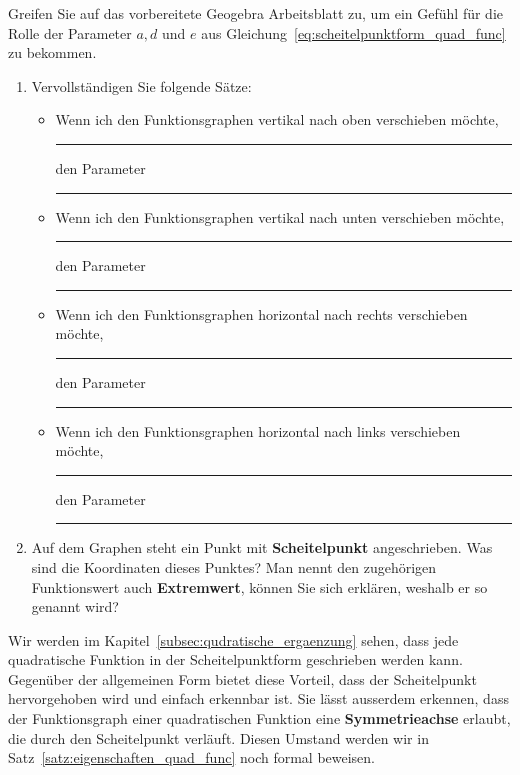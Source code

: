 \documentclass[12pt]{article}
\begin{document}
\begin{exercise}\label{ex:scheitelpunkt_lueckentext}
Greifen Sie auf das vorbereitete Geogebra Arbeitsblatt zu, um ein Gefühl für die Rolle der Parameter $a, d$ und $e$ aus Gleichung~\ref{eq:scheitelpunktform_quad_func} zu bekommen.
\begin{enumerate}
\item Vervollständigen Sie folgende Sätze:
\begin{itemize}
\item Wenn ich den Funktionsgraphen vertikal nach oben verschieben möchte, \rule{3cm}{0.5pt} den Parameter \rule{0.5cm}{0.5pt}
\item  Wenn ich den Funktionsgraphen vertikal nach unten verschieben möchte, \rule{3cm}{0.5pt} den Parameter \rule{0.5cm}{0.5pt}
\item  Wenn ich den Funktionsgraphen horizontal nach rechts verschieben möchte, \rule{3cm}{0.5pt} den Parameter \rule{0.5cm}{0.5pt}
\item  Wenn ich den Funktionsgraphen horizontal nach links verschieben möchte, \rule{3cm}{0.5pt} den Parameter \rule{0.5cm}{0.5pt}
\end{itemize}
\item Auf dem Graphen steht ein Punkt mit \textbf{Scheitelpunkt} angeschrieben. Was sind die Koordinaten dieses Punktes? Man nennt den zugehörigen Funktionswert auch \textbf{Extremwert}, können Sie sich erklären, weshalb er so genannt wird?
\end{enumerate}
\end{exercise}

Wir werden im Kapitel~\ref{subsec:qudratische_ergaenzung} sehen, dass jede quadratische Funktion in der Scheitelpunktform geschrieben werden kann. Gegenüber der allgemeinen Form bietet diese Vorteil, dass der Scheitelpunkt hervorgehoben wird und einfach erkennbar ist. Sie lässt ausserdem erkennen, dass der Funktionsgraph einer quadratischen Funktion eine \textbf{Symmetrieachse} erlaubt, die durch den Scheitelpunkt verläuft. Diesen Umstand werden wir in Satz~\ref{satz:eigenschaften_quad_func} noch formal beweisen.
\end{document}

